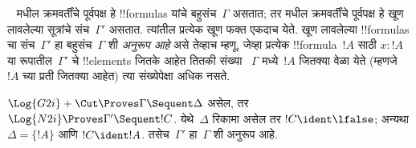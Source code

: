 \documentclass[../../../include/open-logic-section]{subfiles}
\begin{document}


~ मधील क्रमवर्तींचे पूर्वपक्ष हे
!!{formula}s यांचे बहुसंच~$\Gamma$ असतात; तर
 मधील क्रमवर्तींचे पूर्वपक्ष हे
खूण लावलेल्या सूत्रांचे संच~$\Gamma'$ असतात.
त्यांतील प्रत्येक खूण फक्त एकदाच येते.
खूण लावलेल्या !!{formula}s चा संच~$\Gamma'$
हा बहुसंच~$\Gamma$ शी \emph{अनुरूप आहे} असे
तेव्हाच म्हणू, जेव्हा प्रत्येक !!{formula}~$!A$
साठी $x : !A$ या रूपातील~$\Gamma'$ चे
!!{element}s जितके आहेत तितकी संख्या
~$\Gamma$ मध्ये~$!A$ जितक्या वेळा येते
(म्हणजे~$!A$ च्या प्रती जितक्या आहेत) त्या
संख्येपेक्षा अधिक नसते.

\begin{prop}
$\Log{G2i} + \Cut \Proves \Gamma \Sequent \Delta$
असेल, तर
$\Log{N2i} \Proves \Gamma' \Sequent !C$.
येथे~$\Delta$ रिकामा असेल तर
$!C \ident \lfalse$; अन्यथा
$\Delta = \{!A\}$ आणि $!C \ident !A$.
तसेच~$\Gamma'$ हा~$\Gamma$ शी अनुरूप आहे.
\end{prop}
\end{document}
